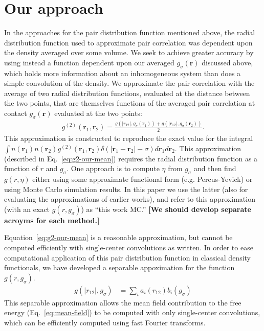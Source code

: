 \documentclass[letterpaper,twocolumn,amsmath,amssymb,pre,aps,10pt]{revtex4-1}
\newcommand{\red}[1]{{\bf \color{red} #1}}
\newcommand{\rr}{\textbf{r}}
\newcommand{\fixme}[1]{\red{[#1]}}
\begin{document}
\section{Our approach}
In the approaches for the pair distribution function mentioned above,
the radial distribution function used to approximate pair correlation
was dependent upon the density averaged over some volume.  We seek to
achieve greater accuracy by using instead a function dependent upon
our averaged $g_{\sigma}(\rr)$ discussed above, which holds more
information about an inhomogeneous system than does a simple
convolution of the density.
%
We approximate the pair correlation with the average of two radial
distribution functions, evaluated at the distance between the two
points, that are themselves functions of the averaged pair correlation
at contact $g_{\sigma}(\rr)$ evaluated at the two points:
%
\begin{align}
  g^{(2)}(\rr_1,\rr_2) = \frac{g(|r_{12}|, g_\sigma(\rr_1)) +
    g(|r_{12}|, g_\sigma(\rr_2))}{2}. \label{eq:g2-our-mean}
\end{align}
This approximation is constructed to reproduce the exact value for the
integral$ \int n(\rr_1)n(\rr_2)
g^{(2)}(\rr_1,\rr_2)\delta(|\rr_1-\rr_2|-\sigma)d\rr_1d\rr_2$.  This
approximation (described in Eq.~\ref{eq:g2-our-mean}) requires the
radial distribution function as a function of $r$ and $g_\sigma$.  One
approach is to compute $\eta$ from $g_\sigma$ and then find
$g(r,\eta)$ either using some approximate functional form
(e.g. Percus-Yevick) or using Monte Carlo simulation results.  In this
paper we use the latter (also for evaluating the approximations of
earlier works), and refer to this approximation (with an exact
$g(r,g_\sigma)$) as ``this work MC.''  \fixme{We should develop
  separate acroyms for each method.}

Equation~\ref{eq:g2-our-mean} is a reasonable approximation, but
cannot be computed efficiently with single-center convolutions as
written.  In order to ease computational application of this pair
distribution function in classical density functionals, we have
developed a separable appoximation for the function $g(r,g_\sigma)$.
\begin{align}
  g(|r_{12}|, g_\sigma) &= \sum_{i} a_i(r_{12}) b_i(g_\sigma)
\end{align}
This separable approximation allows the mean field contribution to
the free energy (Eq.~\ref{eq:mean-field}) to be computed with only
single-center convolutions, which can be efficiently computed using
fast Fourier transforms.
\end{document}
